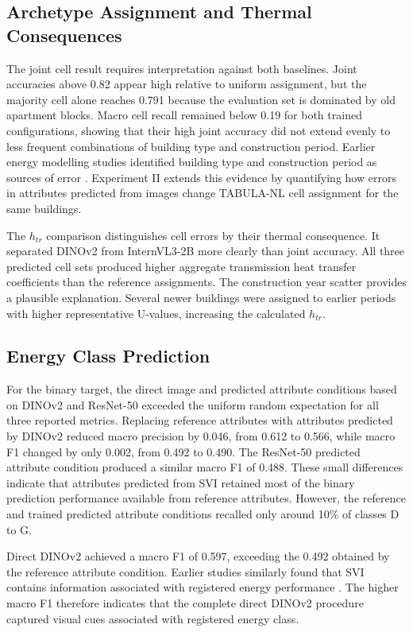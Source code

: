 \subsection{Archetype Assignment and Thermal Consequences}

The joint cell result requires interpretation against both baselines. Joint accuracies above 0.82 appear high relative to uniform assignment, but the majority cell alone reaches 0.791 because the evaluation set is dominated by old apartment blocks. Macro cell recall remained below 0.19 for both trained configurations, showing that their high joint accuracy did not extend evenly to less frequent combinations of building type and construction period. Earlier energy modelling studies identified building type and construction period as sources of error \parencite{dochev2020,bass2022}. Experiment II extends this evidence by quantifying how errors in attributes predicted from images change TABULA-NL cell assignment for the same buildings.

The $h_{tr}$ comparison distinguishes cell errors by their thermal consequence. It separated DINOv2 from InternVL3-2B more clearly than joint accuracy. All three predicted cell sets produced higher aggregate transmission heat transfer coefficients than the reference assignments. The construction year scatter provides a plausible explanation. Several newer buildings were assigned to earlier periods with higher representative U-values, increasing the calculated $h_{tr}$.

\subsection{Energy Class Prediction}

For the binary target, the direct image and predicted attribute conditions based on DINOv2 and ResNet-50 exceeded the uniform random expectation for all three reported metrics. Replacing reference attributes with attributes predicted by DINOv2 reduced macro precision by 0.046, from 0.612 to 0.566, while macro F1 changed by only 0.002, from 0.492 to 0.490. The ResNet-50 predicted attribute condition produced a similar macro F1 of 0.488. These small differences indicate that attributes predicted from \Ac{SVI} retained most of the binary prediction performance available from reference attributes. However, the reference and trained predicted attribute conditions recalled only around 10\% of classes D to G. 

Direct DINOv2 achieved a macro F1 of 0.597, exceeding the 0.492 obtained by the reference attribute condition. Earlier studies similarly found that \Ac{SVI} contains information associated with registered energy performance \parencite{mayer2023uk,mayer2023dk}. The higher macro F1 therefore indicates that the complete direct DINOv2 procedure captured visual cues associated with registered energy class. 

